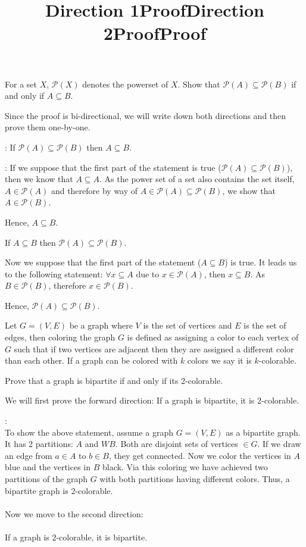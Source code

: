 \documentclass[a4paper]{exam}
\begin{document}
\begin{questions}
For a set $X$, $\mathcal{P}(X)$ denotes the powerset of $X$.
Show that $ \mathcal{P}(A) \subseteq \mathcal {P}(B)$ if and only if $ A \subseteq B$.
\begin{solution}
    Since the proof is bi-directional, we will write down both directions and then prove them one-by-one.

    \title{Direction 1}:
    If $\mathcal{P}(A) \subseteq \mathcal{P}(B)$ then
    $A \subseteq B$.

    \title{Proof}:
    If we suppose that the first part of the statement is true ($\mathcal{P}(A) \subseteq \mathcal{P}(B)$), then we know that $A \subseteq A$. As the power set of a set also contains the set itself, $A \in \mathcal{P}(A)$ and therefore by way of $ A \in \mathcal{P}(A) \subseteq \mathcal{P}(B)$, we show that $A \in \mathcal{P}(B)$. 

    Hence, $A \subseteq B$.

    \title{Direction 2}
     If $A \subseteq B$ then
     $\mathcal{P}(A) \subseteq \mathcal{P}(B)$.

     \title{Proof}
     Now we suppose that the first part of the statement ($A \subseteq B$) is true. It leads us to the following statement: $\forall x \subseteq A$ due to $x \in \mathcal{P}(A)$, then $x \subseteq B$. As $B \in \mathcal{P}(B)$, therefore $x \in \mathcal{P}(B)$. 

     Hence, $\mathcal{P}(A) \subseteq \mathcal{P}(B)$.    
\end{solution}


Let $G = (V, E)$ be a graph where $V$ is the set of vertices and $E$ is the set of edges, then
coloring the graph $G$ is defined as assigning a color to each vertex of $G$ such that if two vertices are adjacent then they are assigned a different color than each other. 
If a graph can be colored with $k$ colors we say it is $k$-colorable.

Prove that a graph is bipartite if and only if its 2-colorable.
\begin{solution}
    We will first prove the forward direction:
    If a graph is bipartite, it is 2-colorable.

    \title{Proof}:
    \\
    To show the above statement, assume a graph $G = (V,E)$ as a bipartite graph. It has 2 partitions: $A$ and $WB$. Both are disjoint sets of vertices $\in G$. If we draw an edge from $a \in A$ to $b \in B$, they get connected. Now we color the vertices in $A$ blue and the vertices in $B$ black. Via this coloring we have achieved two partitions of the graph $G$ with both partitions having different colors. Thus, a bipartite graph is 2-colorable.\\\\
    Now we move to the second direction:
    \\\\
    If a graph is 2-colorable, it is bipartite. 


\end{solution}
\end{questions}
\end{document}
